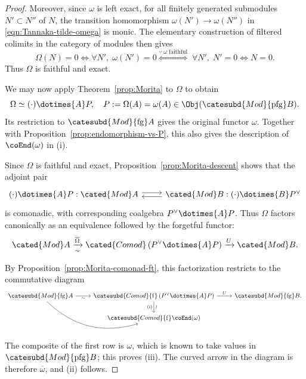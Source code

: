 \begin{proof}
	Moreover, since $\omega$ is left exact, for all finitely generated
	submodules $N'\subset N''$ of $N$, the transition homomorphism
	$\omega(N')\to\omega(N'')$ in \eqref{eqn:Tannaka-tilde-omega} is
	monic. The elementary construction of filtered colimits in the category
	of modules then gives
	\[ \Omega(N) = 0 \iff \forall N', \; \omega(N') = 0 \stackrel{\because \;\omega\;\text{faithful}}{\iff} \; \forall N', \; N' = 0 \iff N = 0. \]
	Thus $\Omega$ is faithful and exact.

	We may now apply Theorem~\ref{prop:Morita} to $\Omega$ to obtain
	\[ \Omega \simeq (\cdot) \dotimes{A} P, \quad P := \Omega(A) = \omega(A) \in \Obj(\catesubd{Mod}{\mathrm{pfg}}B). \]
	Its restriction to $\catesubd{Mod}{\mathrm{fg}}A$ gives the original
	functor $\omega$. Together with
	Proposition~\ref{prop:endomorphism-vs-P}, this also gives the description
	of $\coEnd(\omega)$ in (i).

	Since $\Omega$ is faithful and exact,
	Proposition~\ref{prop:Morita-descent} shows that the adjoint pair
	\begin{equation*}\begin{tikzcd}
		(\cdot) \dotimes{A} P : \cated{Mod}A \arrow[shift left, r] & \cated{Mod}B: (\cdot) \dotimes{B} P^\vee \arrow[shift left, l]
	\end{tikzcd}\end{equation*}
	is comonadic, with corresponding coalgebra $P^\vee\dotimes{A}P$. Thus
	$\Omega$ factors canonically as an equivalence followed by the forgetful
	functor:
	\[ \cated{Mod}A \xrightarrow[\sim]{\overline{\Omega}} \cated{Comod}\left(P^\vee \dotimes{A} P\right) \xrightarrow{U} \cated{Mod}B. \]

	By Proposition~\ref{prop:Morita-comonad-ft}, this factorization restricts
	to the commutative diagram
	\[\begin{tikzcd}
		\catesubd{Mod}{\mathrm{fg}}A \arrow[r, "\sim"'] \arrow[rd, bend right] & \catesubd{Comod}{\mathrm{f}} \left(P^\vee \dotimes{A} P\right) \arrow[r, "U"]  \arrow[d, "\sim" sloped, "{\text{(i)}}"'] & \catesubd{Mod}{\mathrm{fg}}B. \\
		& \catesubd{Comod}{\mathrm{f}}\coEnd(\omega) &
	\end{tikzcd}\]
	The composite of the first row is $\omega$, which is known to take values
	in $\catesubd{Mod}{\mathrm{pfg}}B$; this proves (iii). The curved arrow in
	the diagram is therefore $\overline\omega$, and (ii) follows.
\end{proof}
